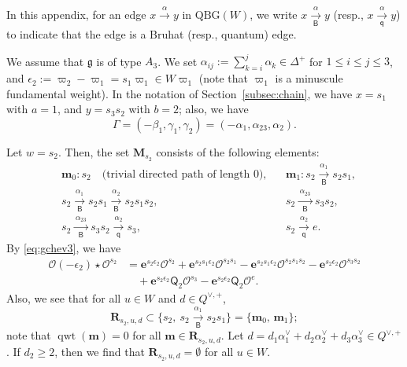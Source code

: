 \documentclass[11pt,a4paper,reqno,dvipdfmx]{amsart}
\numberwithin{equation}{section}
\newcommand{\Fg}{\mathfrak{g}}
\newcommand{\CO}{\mathcal{O}}
\newcommand{\sQ}{\mathsf{Q}}
\newcommand{\vpi}{\varpi}
\newcommand{\eps}{\epsilon}
\newcommand{\be}{\mathbf{e}}
\newcommand{\bm}{\mathbf{m}}
\newcommand{\bM}{\mathbf{M}}
\DeclareMathOperator{\qwt}{qwt}
\newcommand{\QBG}{\mathrm{QBG}}
\newcommand{\edge}[1]{ \xrightarrow{\hspace{2pt}#1\hspace{2pt}} }
\newcommand{\Qe}[1]{ \xrightarrow[\mathsf{q}]{\hspace{2pt}#1\hspace{2pt}} }
\newcommand{\Be}[1]{ \xrightarrow[\mathsf{B}]{\hspace{2pt}#1\hspace{2pt}} }
\newcommand{\bfR}{\mathbf{R}}
\theoremstyle{plain}
\theoremstyle{definition}
\theoremstyle{remark}
\newtheorem{ex}[lem]{Example}
\begin{document}
In this appendix, 
for an edge $x \edge{\alpha} y$ in $\QBG(W)$, 
we write $x \Be{\alpha} y$ (resp., $x \Qe{\alpha} y$) 
to indicate that the edge is a Bruhat (resp., quantum) edge. 

We assume that $\Fg$ is of type $A_{3}$. 
We set $\alpha_{ij}:=\sum_{k=i}^{j}\alpha_{k} \in \Delta^{+}$ for $1 \le i \le j \le 3$, and 
$\eps_{2}:=\vpi_{2}-\vpi_{1}=s_{1}\vpi_{1} \in W\vpi_{1}$ (note that $\vpi_{1}$ is a minuscule fundamental weight). 
In the notation of Section~\ref{subsec:chain}, we have $x = s_{1}$ with $a = 1$, and 
$y = s_{3}s_{2}$ with $b = 2$; also, we have 
%
\begin{equation*}
\Gamma=(-\beta_{1},\gamma_{1},\gamma_{2}) = ( - \alpha_{1}, \alpha_{23}, \alpha_{2}). 
\end{equation*}

%
Let $w = s_{2}$. Then, the set $\bM_{s_{2}}$ consists of the following elements:
%
\begin{align*}
& \bm_{0} : s_{2} \quad \text{(trivial directed path of length $0$)}, & 
& \bm_{1} : s_{2} \Be{\alpha_{1}} s_{2}s_{1}, \\
& s_{2} \Be{\alpha_{1}} s_{2}s_{1} \Be{\alpha_{2}} s_{2}s_{1}s_{2}, & 
& s_{2} \Be{\alpha_{23}} s_{3}s_{2}, \\
& s_{2} \Be{\alpha_{23}} s_{3}s_{2} \Qe{\alpha_{2}} s_{3}, & 
& s_{2} \Qe{\alpha_{2}} e. 
\end{align*}
%
By \eqref{eq:gchev3}, we have
%
\begin{align*}
\CO(- \eps_{2}) \star \CO^{s_{2}} & = 
\be^{s_{2} \eps_{2} } \CO^{s_{2}} + 
\be^{ s_{2}s_{1} \eps_{2} } \CO^{s_{2}s_{1}} -
\be^{ s_{2}s_{1} \eps_{2} } \CO^{s_{2}s_{1}s_{2}} -
\be^{ s_{2} \eps_{2} } \CO^{s_{3}s_{2}} \\
& \quad + 
\be^{ s_{2} \eps_{2} } \sQ_{2} \CO^{s_{3}} - 
\be^{ s_{2} \eps_{2} } \sQ_{2} \CO^{e}.
\end{align*}
%
Also, we see that for all $u \in W$ and $d \in Q^{\vee,+}$,
%
\begin{equation*}
\bfR_{s_{2},u,d} \subset \bigl\{ s_{2}, \ s_{2} \Be{\alpha_1} s_{2}s_{1} \bigr\} = 
\bigl\{ \bm_{0},\, \bm_{1} \bigr\};
\end{equation*}
%
note that $\qwt(\bm) = 0$ for all $\bm \in \bfR_{s_{2},u,d}$. 
Let $d=d_{1}\alpha_{1}^{\vee} + d_{2}\alpha_{2}^{\vee} + d_{3}\alpha_{3}^{\vee} \in Q^{\vee,+}$. 
If $d_{2} \ge 2$, then we find that $\bfR_{s_{2},u,d} = \emptyset$ for all $u \in W$. 
\end{document}
